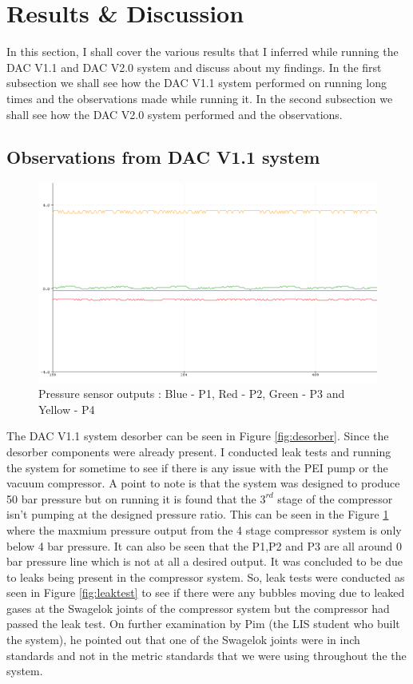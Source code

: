 \section{Results \& Discussion }
\label{sec:results}

In this section, I shall cover the various results that I inferred while running the DAC V1.1 and DAC V2.0 system and discuss about my findings. In the first subsection we shall see how the DAC V1.1 system performed on running long times and the observations made while running it. In the second subsection we shall see how the DAC V2.0 system performed and the observations. 

\subsection{Observations from DAC V1.1 system}
\label{sec:dacv1.1obs}

\begin{figure}[H]
    \centering
    \includegraphics[scale = 1.2]{images/mywork/Sprint2/pressuresensor.png}
    \caption{Pressure sensor outputs : Blue - P1, Red - P2, Green - P3 and Yellow - P4}
    \label{fig:psensor}
\end{figure}


The DAC V1.1 system desorber can be seen in Figure \ref{fig:desorber}. Since the desorber components were already present. I conducted leak tests and running the system for sometime to see if there is any issue with the PEI pump or the vacuum compressor. A point to note is that the system was designed to produce 50 bar pressure but on running it is found that the $3^{rd}$ stage of the compressor isn't pumping at the designed pressure ratio. This can be seen in the Figure \ref{fig:psensor} where the maxmium pressure output from the 4 stage compressor system is only below 4 bar pressure. It can also be seen that the P1,P2 and P3 are all around 0 bar pressure line which is not at all a desired output.
\bigbreak 
It was concluded to be due to leaks being present in the compressor system. So, leak tests were conducted as seen in Figure \ref{fig:leaktest} to see if there were any bubbles moving due to leaked gases at the Swagelok joints of the compressor system but the compressor had passed the leak test. On further examination by Pim (the LIS student who built the system), he pointed out that one of the Swagelok joints were in inch standards and not in the metric standards that we were using throughout the the system. 

